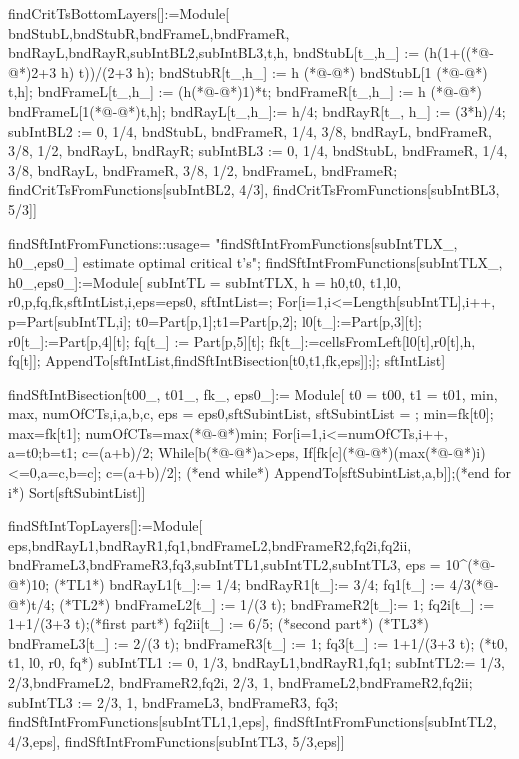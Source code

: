 \begin{code}
findCritTsBottomLayers[]:=Module[
	{bndStubL,bndStubR,bndFrameL,bndFrameR,
	bndRayL,bndRayR,subIntBL2,subIntBL3,t,h},
	bndStubL[t_,h_] := (h(1+((*@-@*)2+3 h) t))/(2+3 h);
	bndStubR[t_,h_] := h (*@-@*) bndStubL[1 (*@-@*) t,h];
	bndFrameL[t_,h_] := (h(*@-@*)1)*t;
	bndFrameR[t_,h_] := h (*@-@*) bndFrameL[1(*@-@*)t,h];
	bndRayL[t_,h_]:= h/4;
	bndRayR[t_, h_] := (3*h)/4;
	subIntBL2 := { 
	{0, 1/4, bndStubL, bndFrameR}, 
	{1/4, 3/8, bndRayL, bndFrameR}, 
	{3/8, 1/2, bndRayL, bndRayR}};
	subIntBL3 := {
	{0, 1/4, bndStubL, bndFrameR},
	{1/4, 3/8, bndRayL, bndFrameR},
	{3/8, 1/2, bndFrameL, bndFrameR}};
{findCritTsFromFunctions[subIntBL2, 4/3],
findCritTsFromFunctions[subIntBL3, 5/3]}]
\end{code}

\begin{code}
findSftIntFromFunctions::usage=
"findSftIntFromFunctions[subIntTLX_, h0_,eps0_] estimate optimal
critical t's";
findSftIntFromFunctions[subIntTLX_, h0_,eps0_]:=Module[
	{subIntTL = subIntTLX, h = h0,t0, t1,l0,
	r0,p,fq,fk,sftIntList,i,eps=eps0},
	sftIntList={};
	For[i=1,i<=Length[subIntTL],i++,
		p=Part[subIntTL,i];
		t0=Part[p,1];t1=Part[p,2];
		l0[t_]:=Part[p,3][t];
		r0[t_]:=Part[p,4][t];
		fq[t_] := Part[p,5][t];
		fk[t_]:=cellsFromLeft[l0[t],r0[t],h, fq[t]];
		AppendTo[sftIntList,findSftIntBisection[t0,t1,fk,eps]];];
sftIntList]
\end{code}

\begin{code}
findSftIntBisection[t00_, t01_, fk_, eps0_]:= Module[
	{t0 = t00, t1 = t01, min, max,
	numOfCTs,i,a,b,c, eps = eps0,sftSubintList},
	sftSubintList = {};
	min=fk[t0];
	max=fk[t1];
	numOfCTs=max(*@-@*)min;
	For[i=1,i<=numOfCTs,i++,
		a=t0;b=t1;
		c=(a+b)/2;
		While[b(*@-@*)a>eps,
			If[fk[c](*@-@*)(max(*@-@*)i)<=0,a=c,b=c];
			c=(a+b)/2]; (*end while*)
		AppendTo[sftSubintList,{a,b}]];(*end for i*)
	Sort[sftSubintList]]
\end{code}

\begin{code}
findSftIntTopLayers[]:=Module[
	{eps,bndRayL1,bndRayR1,fq1,bndFrameL2,bndFrameR2,fq2i,fq2ii,
	bndFrameL3,bndFrameR3,fq3,subIntTL1,subIntTL2,subIntTL3},
	eps = 10^(*@-@*)10;
	(*TL1*)
	bndRayL1[t_]:= 1/4; 
	bndRayR1[t_]:= 3/4;
	fq1[t_] := 4/3(*@-@*)t/4;
	(*TL2*)
	bndFrameL2[t_] := 1/(3 t);
	bndFrameR2[t_]:= 1;
	fq2i[t_] := 1+1/(3+3 t);(*first part*)
	fq2ii[t_] :=  6/5; (*second part*)
	(*TL3*)
	bndFrameL3[t_] := 2/(3 t);
	bndFrameR3[t_] := 1;
	fq3[t_] := 1+1/(3+3 t);
	(*{t0, t1, l0, r0, fq}*)
	subIntTL1 := { 
	{0, 1/3, bndRayL1,bndRayR1,fq1}};
	subIntTL2:= {
	{1/3, 2/3,bndFrameL2, bndFrameR2,fq2i},
	{2/3, 1, bndFrameL2,bndFrameR2,fq2ii}};
	subIntTL3 := {
	{2/3, 1, bndFrameL3, bndFrameR3, fq3}};
{findSftIntFromFunctions[subIntTL1,1,eps],
findSftIntFromFunctions[subIntTL2, 4/3,eps],
findSftIntFromFunctions[subIntTL3, 5/3,eps]}]
\end{code}

